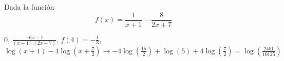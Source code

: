 \documentclass[addpoints,spanish, 12pt,a4paper]{exam}
\begin{document}
\begin{questions}

\question[4] Dada la función $$f(x)=\dfrac{1}{x+1}-\dfrac{8}{2x+7}$$
\begin{solution}
    $0$, $\frac{- 6 x - 1}{\left(x + 1\right) \left(2 x + 7\right)}$, $f(4)=-\frac{1}{3}$, $\log{\left(x + 1 \right)} - 4 \log{\left(x + \frac{7}{2} \right)} \to - 4 \log{\left(\frac{15}{2} \right)} + \log{\left(5 \right)} + 4 \log{\left(\frac{7}{2} \right)}= \log{\left(\frac{2401}{10125} \right)}$
\end{solution}


\end{questions}
\end{document}
